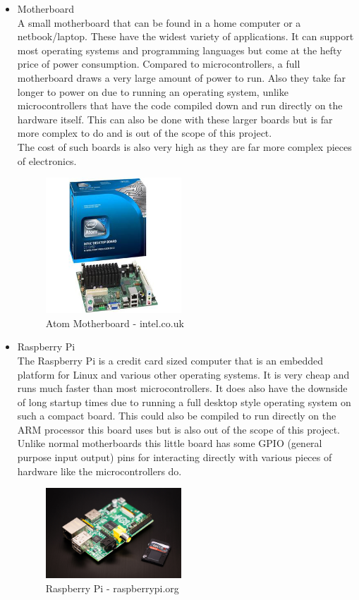 \begin{itemize}
\item Motherboard
\\A small motherboard that can be found in a home computer or a netbook/laptop.  These have the widest variety of applications.  It can support most operating systems and programming languages but come at the hefty price of power consumption.  Compared to microcontrollers, a full motherboard draws a very large amount of power to run.  Also they take far longer to power on due to running an operating system, unlike microcontrollers that have the code compiled down and run directly on the hardware itself.  This can also be done with these larger boards but is far more complex to do and is out of the scope of this project.
\\The cost of such boards is also very high as they are far more complex pieces of electronics.
\begin{figure}[h]
\centering
        \includegraphics[width=2.0in] {Images/atom.jpg}
        \caption{Atom Motherboard - intel.co.uk}
        \label{Atom Motherboard}
\end{figure}
\item Raspberry Pi
\\The Raspberry Pi is a credit card sized computer that is an embedded platform for Linux and various other operating systems.  It is very cheap and runs much faster than most microcontrollers.  It does also have the downside of long startup times due to running a full desktop style operating system on such a compact board.  This could also be compiled to run directly on the ARM processor this board uses but is also out of the scope of this project.  Unlike normal motherboards this little board has some GPIO (general purpose input output) pins for interacting directly with various pieces of hardware like the microcontrollers do.
\begin{figure}[h]
\centering
        \includegraphics[width=2.0in] {Images/rpi.jpeg}
        \caption{Raspberry Pi - raspberrypi.org}
        \label{Raspberry Pi}
\end{figure}

\end{itemize}


